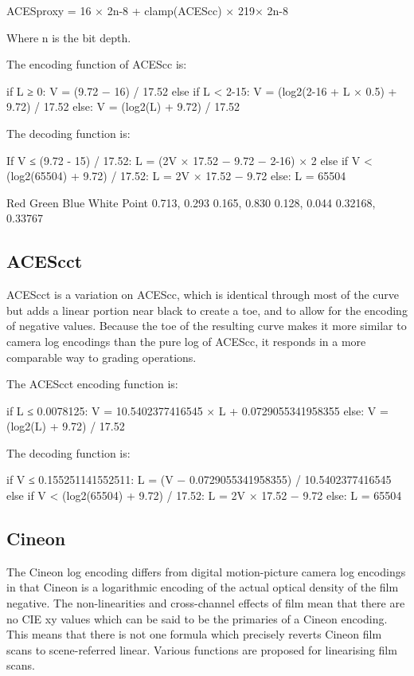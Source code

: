 	ACESproxy = 16 × 2n-8 + clamp(ACEScc) × 219× 2n-8

Where n is the bit depth.

The encoding function of ACEScc is:

	if L ≥ 0:
		V = (9.72 − 16) / 17.52
	else if L < 2-15:
		V = (log2(2-16 + L × 0.5) + 9.72) / 17.52
	else:
		V = (log2(L) + 9.72) / 17.52



The decoding function is:

	If V ≤ (9.72 - 15) / 17.52:
		L = (2V × 17.52 − 9.72 − 2-16) × 2
	else if V < (log2(65504) + 9.72) / 17.52:
		L = 2V × 17.52 − 9.72
	else:
		L = 65504


Red
Green
Blue
White Point
0.713, 0.293
0.165, 0.830
0.128, 0.044
0.32168, 0.33767

\subsection{ACEScct}%
\label{subsec:acescct}
ACEScct is a variation on ACEScc, which is identical through most of the curve but adds a linear portion near black to create a toe, and to allow for the encoding of negative values. Because the toe of the resulting curve makes it more similar to camera log encodings than the pure log of ACEScc, it responds in a more comparable way to grading operations.

The ACEScct encoding function is:

	if L ≤ 0.0078125:
		V = 10.5402377416545 × L + 0.0729055341958355
	else:
		V = (log2(L) + 9.72) / 17.52



The decoding function is:

	if V ≤ 0.155251141552511:
		L = (V − 0.0729055341958355) / 10.5402377416545
	else if V < (log2(65504) + 9.72) / 17.52:
		L = 2V × 17.52 − 9.72
	else:
		L = 65504

\subsection{Cineon}%
\label{subsec:cineon}

The Cineon log encoding differs from digital motion-picture camera log encodings in that Cineon is a logarithmic encoding of the actual optical density of the film negative. The non-linearities and cross-channel effects of film mean that there are no CIE xy values which can be said to be the primaries of a Cineon encoding. This means that there is not one formula which precisely reverts Cineon film scans to scene-referred linear. Various functions are proposed for linearising film scans.

